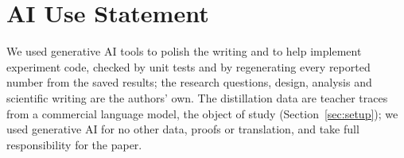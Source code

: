 \section*{AI Use Statement}
We used generative AI tools to polish the writing and to help implement experiment code, checked by unit
tests and by regenerating every reported number from the saved results; the research questions, design,
analysis and scientific writing are the authors' own. The distillation data are teacher traces from a
commercial language model, the object of study (Section~\ref{sec:setup}); we used generative AI for no
other data, proofs or translation, and take full responsibility for the paper.
